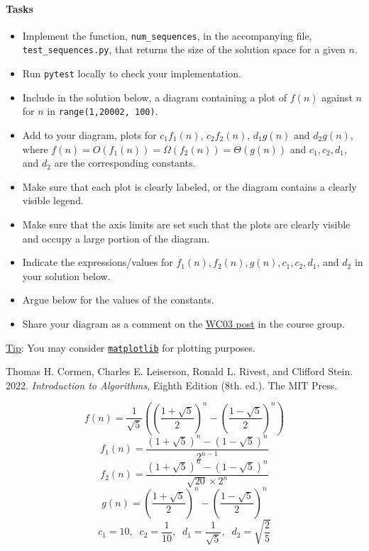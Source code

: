 \documentclass[a4paper]{exam}
\begin{document}
\begin{questions}
  \paragraph{Tasks}
  \begin{itemize}
    \item Implement the function, \texttt{num\_sequences}, in the accompanying file, \texttt{test\_sequences.py}, that returns the size of the solution space for a given $n$.
    \item Run \texttt{pytest} locally to check your implementation.
    \item Include in the solution below, a diagram containing a plot of $f(n)$ against $n$ for $n$ in \texttt{range(1,20002, 100)}.
    \item Add to your diagram, plots for $c_1f_1(n)$, $c_2f_2(n)$, $d_1g(n)$ and $d_2g(n)$, where $f(n)=O(f_1(n))=\Omega(f_2(n))=\Theta(g(n))$ and $c_1,c_2,d_1$, and $d_2$ are the corresponding constants.
    \item Make sure that each plot is clearly labeled, or the diagram contains a clearly visible legend.
    \item Make sure that the axis limits are set such that the plots are clearly visible and occupy a large portion of the diagram.
    \item Indicate the expressions/values for  $f_1(n), f_2(n), g(n), c_1,c_2,d_1$, and $d_2$ in your solution below.
    \item Argue below for the values of the constants.
    \item Share your diagram as a comment on the \href{https://web.yammer.com/main/org/habib.edu.pk/threads/eyJfdHlwZSI6IlRocmVhZCIsImlkIjoiMjEwMjY3NTY0NDY3ODE0NCJ9}{WC03 post} in the course group.
  \end{itemize}
  \underline{Tip}: You may consider \href{https://matplotlib.org/stable/tutorials/introductory/pyplot.html}{\texttt{matplotlib}} for plotting purposes.


  \begin{thebibliography}{9}
    Thomas H. Cormen, Charles E. Leiserson, Ronald L. Rivest, and Clifford Stein. 2022. \textit{Introduction to Algorithms}, Eighth Edition (8th. ed.). The MIT Press.
  \end{thebibliography}

  \begin{solution}
    $$f(n) = \frac{1}{\sqrt{5}}\left( \left(\frac{1+\sqrt{5}}{2}\right)^n - \left(\frac{1-\sqrt{5}}{2}\right)^n\right)$$
    $$f_1(n) = \frac{(1+\sqrt{5})^n-(1-\sqrt{5})^n}{2^{n-1}}$$
    $$f_2(n) = \frac{(1+\sqrt{5})^n-(1-\sqrt{5})^n}{\sqrt{20}\times 2^n}$$
    $$g(n) = \left(\frac{1+\sqrt{5}}{2}\right)^n - \left(\frac{1-\sqrt{5}}{2}\right)^n$$
    $$c_1 = 10,\;\;c_2 = \frac{1}{10}, \;\; d_1 = \frac{1}{\sqrt{5}} , \;\; d_2 = \sqrt{\frac{2}{5}}$$
  \end{solution}

\end{questions}
\end{document}
